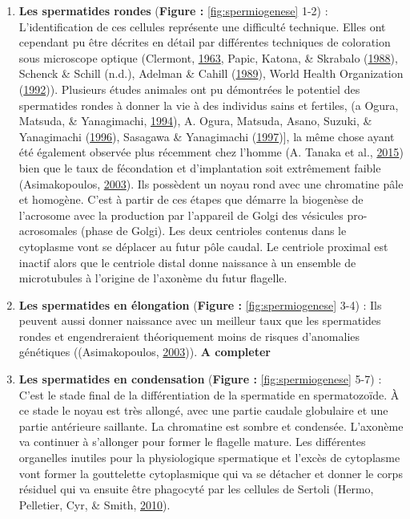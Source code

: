 \documentclass[12pt,twoside]{reedthesis}
\providecommand{\tightlist}{%
  \setlength{\itemsep}{0pt}\setlength{\parskip}{0pt}}
\theoremstyle{definition}
\theoremstyle{definition}
\theoremstyle{remark}
\begin{document}
  \begin{enumerate}
  \def\labelenumi{\arabic{enumi}.}
  \tightlist
  \item
    \textbf{Les spermatides rondes} (\textbf{Figure :
    }\ref{fig:spermiogenese} 1-2) : L'identification de ces cellules
    représente une difficulté technique. Elles ont cependant pu être
    décrites en détail par différentes techniques de coloration sous
    microscope optique (Clermont,
    \protect\hyperlink{ref-Clermont1963}{1963}, Papic, Katona, \& Skrabalo
    (\protect\hyperlink{ref-Papic}{1988}), Schenck \& Schill (n.d.),
    Adelman \& Cahill (\protect\hyperlink{ref-Adelman1989}{1989}), World
    Health Organization
    (\protect\hyperlink{ref-WorldHealthOrganization1992}{1992})).
    Plusieurs études animales ont pu démontrées le potentiel des
    spermatides rondes à donner la vie à des individus sains et fertiles,
    (a Ogura, Matsuda, \& Yanagimachi,
    \protect\hyperlink{ref-Ogura1994}{1994}), A. Ogura, Matsuda, Asano,
    Suzuki, \& Yanagimachi (\protect\hyperlink{ref-Kimura1995}{1996}),
    Sasagawa \& Yanagimachi (\protect\hyperlink{ref-Sasagawa}{1997}){]},
    la même chose ayant été également observée plus récemment chez l'homme
    (A. Tanaka et al., \protect\hyperlink{ref-Tanaka2015}{2015}) bien que
    le taux de fécondation et d'implantation soit extrêmement faible
    (Asimakopoulos, \protect\hyperlink{ref-Asimakopoulos2003}{2003}). Ils
    possèdent un noyau rond avec une chromatine pâle et homogène. C'est à
    partir de ces étapes que démarre la biogenèse de l'acrosome avec la
    production par l'appareil de Golgi des vésicules pro-acrosomales
    (phase de Golgi). Les deux centrioles contenus dans le cytoplasme vont
    se déplacer au futur pôle caudal. Le centriole proximal est inactif
    alors que le centriole distal donne naissance à un ensemble de
    microtubules à l'origine de l'axonème du futur flagelle.\\
  \item
    \textbf{Les spermatides en élongation} (\textbf{Figure :
    }\ref{fig:spermiogenese} 3-4) : Ils peuvent aussi donner naissance
    avec un meilleur taux que les spermatides rondes et engendreraient
    théoriquement moins de risques d'anomalies génétiques ((Asimakopoulos,
    \protect\hyperlink{ref-Asimakopoulos2003}{2003})). \textbf{A
    completer}\\
  \item
    \textbf{Les spermatides en condensation} (\textbf{Figure :
    }\ref{fig:spermiogenese} 5-7) : C'est le stade final de la
    différentiation de la spermatide en spermatozoïde. À ce stade le noyau
    est très allongé, avec une partie caudale globulaire et une partie
    antérieure saillante. La chromatine est sombre et condensée. L'axonème
    va continuer à s'allonger pour former le flagelle mature. Les
    différentes organelles inutiles pour la physiologique spermatique et
    l'excès de cytoplasme vont former la gouttelette cytoplasmique qui va
    se détacher et donner le corps résiduel qui va ensuite être phagocyté
    par les cellules de Sertoli (Hermo, Pelletier, Cyr, \& Smith,
    \protect\hyperlink{ref-Hermo2010}{2010}).
  \end{enumerate}
  
\end{document}
